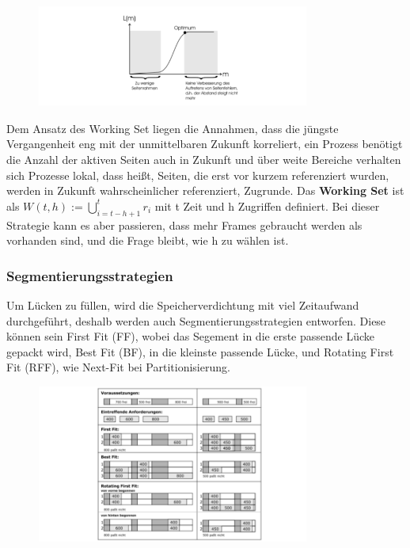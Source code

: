 \documentclass{article}
\begin{document}
    \begin{figure}[H]
        \centering
	    \includegraphics[width=90mm]{Skizzen/3_Kapitel/lifetimefunktion.png}
    \end{figure}\newline
    Dem Ansatz des Working Set liegen die Annahmen, dass die jüngste Vergangenheit eng mit der unmittelbaren Zukunft korreliert, ein Prozess benötigt die Anzahl der aktiven Seiten auch in Zukunft und über weite Bereiche verhalten sich Prozesse lokal, dass heißt, Seiten, die erst vor kurzem referenziert wurden, werden in Zukunft wahrscheinlicher referenziert, Zugrunde.\newline
    Das \textbf{Working Set} ist als $W(t,h):=\bigcup_{i=t-h+1}^t r_i$ mit t Zeit und h Zugriffen definiert.\newline
    Bei dieser Strategie kann es aber passieren, dass mehr Frames gebraucht werden als vorhanden sind, und die Frage bleibt, wie h zu wählen ist. 
\subsubsection{Segmentierungsstrategien}
    Um Lücken zu füllen, wird die Speicherverdichtung mit viel Zeitaufwand durchgeführt, deshalb werden auch Segmentierungsstrategien entworfen.\newline
    Diese können sein First Fit (FF), wobei das Segement in die erste passende Lücke gepackt wird, Best Fit (BF), in die kleinste passende Lücke, und Rotating First Fit (RFF), wie Next-Fit bei Partitionisierung. 
    \begin{figure}[H]
        \centering
	    \includegraphics[width=90mm]{Skizzen/3_Kapitel/segmentierungsstrategien.png}
    \end{figure}
\end{document}
